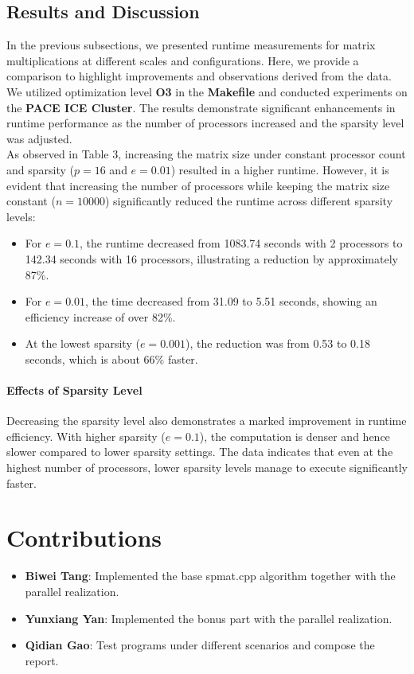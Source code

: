 \documentclass{article}
\begin{document}
\subsection{Results and Discussion}

In the previous subsections, we presented runtime measurements for matrix multiplications at different scales and configurations. Here, we provide a comparison to highlight improvements and observations derived from the data.\\
We utilized optimization level \textbf{O3} in the \textbf{Makefile} and conducted experiments on the \textbf{PACE ICE Cluster}. The results demonstrate significant enhancements in runtime performance as the number of processors increased and the sparsity level was adjusted.\\
As observed in Table 3, increasing the matrix size under constant processor count and sparsity (\( p = 16 \) and \( e = 0.01 \)) resulted in a higher runtime. However, it is evident that increasing the number of processors while keeping the matrix size constant (\( n = 10000 \)) significantly reduced the runtime across different sparsity levels:
\begin{itemize}
    \item For \( e = 0.1 \), the runtime decreased from 1083.74 seconds with 2 processors to 142.34 seconds with 16 processors, illustrating a reduction by approximately 87\%.
    \item For \( e = 0.01 \), the time decreased from 31.09 to 5.51 seconds, showing an efficiency increase of over 82\%.
    \item At the lowest sparsity (\( e = 0.001 \)), the reduction was from 0.53 to 0.18 seconds, which is about 66\% faster.
\end{itemize}

\paragraph{Effects of Sparsity Level}
Decreasing the sparsity level also demonstrates a marked improvement in runtime efficiency. With higher sparsity (\( e = 0.1 \)), the computation is denser and hence slower compared to lower sparsity settings. The data indicates that even at the highest number of processors, lower sparsity levels manage to execute significantly faster.

\section{Contributions}
\begin{itemize}
    \item \textbf{Biwei Tang}: Implemented the base spmat.cpp algorithm together with the parallel realization.
    \item \textbf{Yunxiang Yan}: Implemented the bonus part with the parallel realization.
    \item \textbf{Qidian Gao}: Test programs under different scenarios and compose the report.
\end{itemize}
\end{document}
